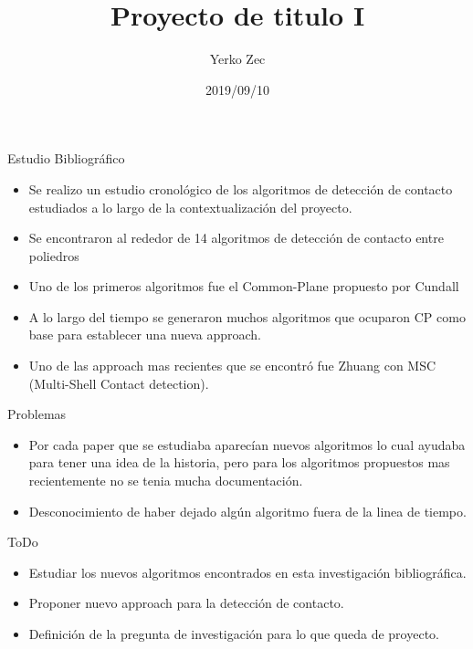 \documentclass{beamer}
\title{Proyecto de titulo I}
\author{Yerko Zec}
\institute[]{FI - UNAB}
\date{2019/09/10}
\begin{document}
\begin{frame}[plain]
  \titlepage
\end{frame}

\addtocounter{framenumber}{-1}

\begin{frame}{Estudio Bibliográfico}
\begin{itemize}
 \item Se realizo un estudio cronológico de los algoritmos de detección de contacto estudiados a lo largo de la contextualización del proyecto. 
 \item Se encontraron al rededor de 14 algoritmos de detección de contacto entre poliedros
 \item Uno de los primeros algoritmos fue el Common-Plane propuesto por Cundall\cite{1988-Cundall}
 \item A lo largo del tiempo se generaron muchos algoritmos que ocuparon CP como base para establecer una nueva approach.
 \item Uno de las approach mas recientes que se encontró fue Zhuang\cite{2014-Zhuang} con MSC (Multi-Shell Contact detection).
\end{itemize}
\end{frame}

\begin{frame}{Problemas}
 \begin{itemize}
  \item Por cada paper que se estudiaba aparecían nuevos algoritmos lo cual ayudaba para tener una idea de la historia, pero para los algoritmos propuestos mas recientemente no se tenia mucha documentación.
  \item Desconocimiento de haber dejado algún algoritmo fuera de la linea de tiempo.
 \end{itemize}
\end{frame}


\begin{frame}{ToDo}
\begin{itemize}
 \item Estudiar los nuevos algoritmos encontrados en esta investigación bibliográfica. 
 \item Proponer nuevo approach para la detección de contacto.
 \item Definición de la pregunta de investigación para lo que queda de proyecto.
\end{itemize}
\end{frame}

\medskip


\end{document}

